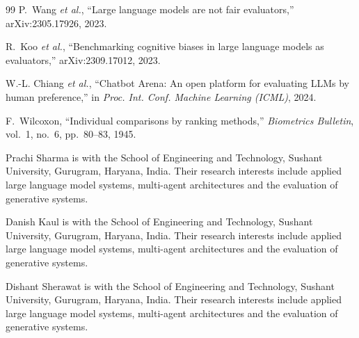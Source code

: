 \documentclass[journal]{IEEEtran}
\begin{document}
\begin{thebibliography}{99}
P.~Wang \emph{et al.}, ``Large language models are not fair evaluators,''
arXiv:2305.17926, 2023.

R.~Koo \emph{et al.}, ``Benchmarking cognitive biases in large language models
as evaluators,'' arXiv:2309.17012, 2023.

W.-L. Chiang \emph{et al.}, ``Chatbot Arena: An open platform for evaluating
LLMs by human preference,'' in \emph{Proc. Int. Conf. Machine Learning (ICML)},
2024.

F.~Wilcoxon, ``Individual comparisons by ranking methods,'' \emph{Biometrics
Bulletin}, vol.~1, no.~6, pp.~80--83, 1945.
\end{thebibliography}

\begin{IEEEbiographynophoto}{Prachi Sharma}
is with the School of Engineering and Technology, Sushant University, Gurugram,
Haryana, India. Their research interests include applied large language model systems,
 multi-agent architectures and the evaluation of generative systems.
\end{IEEEbiographynophoto}

\begin{IEEEbiographynophoto}{Danish Kaul}
is with the School of Engineering and Technology, Sushant University, Gurugram,
Haryana, India. Their research interests include applied large language model systems,
 multi-agent architectures and the evaluation of generative systems.
\end{IEEEbiographynophoto}

\begin{IEEEbiographynophoto}{Dishant Sherawat}
is with the School of Engineering and Technology, Sushant University, Gurugram,
Haryana, India. Their research interests include applied large language model systems,
 multi-agent architectures and the evaluation of generative systems.
\end{IEEEbiographynophoto}
\end{document}
